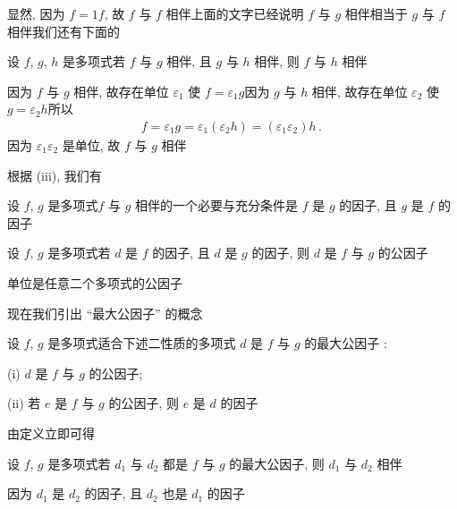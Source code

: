 显然, 因为 $f = 1f$, 故 $f$ 与 $f$ 相伴\period 上面的文字已经说明 $f$ 与 $g$ 相伴相当于 $g$ 与 $f$ 相伴\period 我们还有下面的
\begin{proposition}
    设 $f$, $g$, $h$ 是多项式\period 若 $f$ 与 $g$ 相伴, 且 $g$ 与 $h$ 相伴, 则 $f$ 与 $h$ 相伴\period
\end{proposition}

\begin{pf}
    因为 $f$ 与 $g$ 相伴, 故存在单位 $\varepsilon_1$ 使 $f = \varepsilon_1 g$\period 因为 $g$ 与 $h$ 相伴, 故存在单位 $\varepsilon_2$ 使 $g = \varepsilon_2 h$\period 所以
    \begin{align*}
        f = \varepsilon_1 g = \varepsilon_1 (\varepsilon_2 h) = (\varepsilon_1 \varepsilon_2) h \period
    \end{align*}
    因为 $\varepsilon_1 \varepsilon_2$ 是单位, 故 $f$ 与 $g$ 相伴\period
\end{pf}

根据 (iii), 我们有
\begin{proposition}
    设 $f$, $g$ 是多项式\period $f$ 与 $g$ 相伴的一个必要与充分条件是 $f$ 是 $g$ 的因子, 且 $g$ 是 $f$ 的因子\period
\end{proposition}

\begin{definition}
    设 $f$, $g$ 是多项式\period 若 $d$ 是 $f$ 的因子, 且 $d$ 是 $g$ 的因子, 则 $d$ 是 $f$ 与 $g$ 的公因子 \period
\end{definition}

\begin{example}
    单位是任意二个多项式的公因子\period
\end{example}

现在我们引出 ``最大公因子'' 的概念\period

\begin{definition}
    设 $f$, $g$ 是多项式\period 适合下述二性质的多项式 $d$ 是 $f$ 与 $g$ 的最大公因子 :

    (i) $d$ 是 $f$ 与 $g$ 的公因子;

    (ii) 若 $e$ 是 $f$ 与 $g$ 的公因子, 则 $e$ 是 $d$ 的因子\period
\end{definition}

由定义立即可得
\begin{proposition}
    设 $f$, $g$ 是多项式\period 若 $d_1$ 与 $d_2$ 都是 $f$ 与 $g$ 的最大公因子, 则 $d_1$ 与 $d_2$ 相伴\period
\end{proposition}

\begin{pf}
    因为 $d_1$ 是 $d_2$ 的因子, 且 $d_2$ 也是 $d_1$ 的因子\period
\end{pf}

